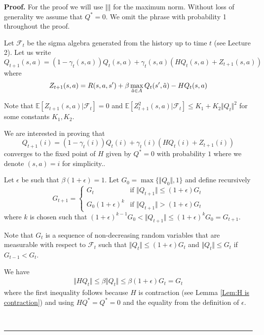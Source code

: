 \documentclass[letter,11pt]{article}
\newenvironment {proof}[1][Proof]{\noindent \textbf {#1.} }{\ \rule {0.5em}{0.5em}}
\begin{document}
\begin{proof} For the proof we will use $\Vert \Vert$ for the maximum norm.  Without loss of generality we assume that $Q^{*} =0$. We omit the phrase with probability 1 throughout the proof. 


    Let $\mathcal{F}_{t}$ be the sigma algebra generated from the history up to time $t$  (see Lecture 2). 
 Let us write 
 \begin{equation} 
     Q_{t+1} (s,a) = (1- \gamma_{t}(s,a) ) Q_{t}(s,a) + \gamma_{t}(s,a) \left (HQ_{t}(s,a)  + Z_{t+1} (s,a) \right )
     \end{equation}
     where 
     $$ Z_{t+1} (s,a) = R(s,a,s') + \beta \max_{\Tilde{a} \in A} Q_{t}(s' ,\Tilde{a}) -  HQ_{t}(s,a) $$

     Note that $\mathbb{E} [Z_{t+1} (s,a) | \mathcal{F}_{t} ] =0$ and $\mathbb{E} [Z_{t+1}^{2} (s,a) | \mathcal{F}_{t} ] \leq K_{1} + K_{2} \Vert Q_{t} \Vert^{2} $  for some constants $K_{1},K_{2}$.

     We are interested in proving that 
     $$Q_{t+1}(i) = (1- \gamma_{t}(i) )Q_{t}(i) + \gamma_{t}(i) (HQ_{t}(i) + Z_{t+1} (i) )$$
converges to the fixed point of $H$ given by $Q^{*} = 0$ with probability $1$ where we denote $(s,a) = i$ for simplicity.. 

Let $\epsilon$ be such that $\beta (1+\epsilon) =1 $. Let $G_{0} = \max \{ \Vert Q_{0} \Vert  , 1 \}$ and define recursively 
\begin{equation*}
    G_{t+1} =
    \begin{cases}
        G_{t} & \text{if } \Vert Q_{t+1} \Vert \leq (1+\epsilon) G_{t} \\
        G_{0}(1+\epsilon)^{k} & \text{if } \Vert Q_{t+1} \Vert > (1+\epsilon) G_{t}
    \end{cases}
\end{equation*} where $k$ is chosen such that $(1+\epsilon)^{k-1} G_{0} <\Vert Q_{t+1} \Vert   \leq (1+\epsilon)^{k} G_{0} = G_{t+1} $. 

Note that $G_{t}$ is a sequence of non-decreasing random variables that are measurable with respect to $\mathcal{F}_{t}$ such that  $\Vert Q_{t} \Vert   \leq (1+\epsilon) G_{t} $ and $\Vert Q_{t} \Vert   \leq  G_{t} $ if $G_{t-1} < G_{t}$.  

We have
\begin{align} \label{Eq:Q_proof_Gt}
  \Vert HQ_{t} \Vert   \leq \beta \Vert Q_{t} \Vert \leq  \beta (1+\epsilon) G_{t} = G_{t}
\end{align}
where the first inequality follows because $H$ is contraction (see Lemma \ref{Lem:H is contraction}) and using $HQ^{*}=Q^{*} = 0$ and the equality from the definition of $\epsilon$.


\end{proof}
\end{document}

